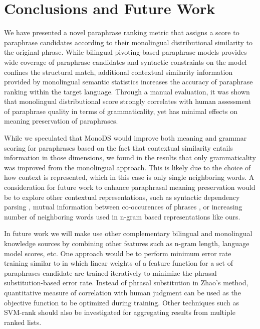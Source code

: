 \documentclass[11pt]{article}
\begin{document}
{{%
\section{Conclusions and Future Work}
We have presented a novel paraphrase ranking metric that assigns a score to paraphrase candidates according to their monolingual distributional similarity to the original phrase. While bilingual pivoting-based paraphrase models provides wide coverage of paraphrase candidates and syntactic constraints on the model confines the structural match, additional contextual similarity information provided by monolingual semantic statistics increases the accuracy of paraphrase ranking within the target language. %
Through a manual evaluation, it was shown that monolingual distributional score strongly correlates with human assessment of paraphrase quality in terms of grammaticality, yet has minimal effects on meaning preservation of paraphrases.

While we speculated that MonoDS would improve both meaning and grammar scoring
for paraphrases based on the fact that contextual similarity entails information
in those dimensions, we found in the results that only grammaticality was
improved from the monolingual approach. This is likely due to the choice of how
context is represented, which in this case is only single neighboring words. A
consideration for future work to enhance paraphrasal meaning preservation would
be to explore other contextual representations, such as syntactic dependency
parsing \cite{LinACL97}, mutual information between co-occurences of phrases
, or increasing number of neighboring words used in
n-gram based representations like ours.

In future work we will make use other complementary bilingual and monolingual knowledge sources by combining other features such as n-gram length, language model scores, etc. One approach would be to perform minimum error rate training similar to  in which linear weights of a feature function for a set of paraphrases candidate are trained iteratively to minimize the phrasal-substitution-based error rate. Instead of phrasal substitution in Zhao's method, quantitative measure of correlation with human judgment can be used as the objective function to be optimized during training. Other techniques such as SVM-rank \cite{Joachims02} should also be investigated for aggregating results from multiple ranked lists. 

}}
\end{document}
